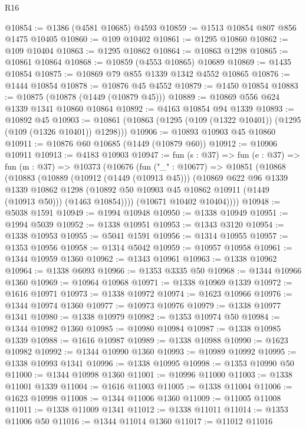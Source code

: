 \begin{lexlean}{R16}
\begin{coremodule}
@10854 := @1386 (@4581 @10685) @4593
@10859 := @1513 @10854 @807 @856 @1475 @10405
@10860 := @109 @10402
@10861 := @1295 @10860
@10862 := @109 @10404
@10863 := @1295 @10862
@10864 := @10863 @1298
@10865 := @10861 @10864
@10868 := @10859 (@4553 @10865) @10689
@10869 := @1435 @10854
@10875 := @10869 @79 @855 @1339 @1342 @4552 @10865
@10876 := @1444 @10854
@10878 := @10876 @45 @4552
@10879 := @1450 @10854
@10883 := @10875 (@10878 (@1449 (@10879 @45)))
@10889 := @10869 @556 @624 @1339 @1341 @10860 @10864
@10892 := @4163 @10854 @94 @1339
@10893 := @10892 @45
@10903 := @10861 (@10863 (@1295 (@109 (@1322 @10401)) (@1295 (@109 (@1326 @10401)) @1298)))
@10906 := @10893 @10903 @45 @10860
@10911 := @10876 @60 @10685 (@1449 (@10879 @60))
@10912 := @10906 @10911
@10913 := @4183 @10903
@10947 := fun (s : @37) =>
  fun (e : @37) =>
  fun (m : @37) =>
  @10373
    (@10676
      (fun ("_" : @10677) =>
      @10851
        (@10868
          (@10883
            (@10889
              (@10912 (@1449 (@10913 @45)))
              (@10869
                @622
                @96
                @1339
                @1339
                @10862
                @1298
                (@10892 @50 @10903 @45 @10862 @10911 (@1449 (@10913 @50)))
                (@1463 @10854))))
          (@10671 @10402 @10404))))
@10948 := @5038 @1591
@10949 := @1994 @10948
@10950 := @1338 @10949
@10951 := @1994 @5039
@10952 := @1338 @10951
@10953 := @1343 @3120
@10954 := @1338 @10953
@10955 := @5041 @1591
@10956 := @1314 @10955
@10957 := @1353 @10956
@10958 := @1314 @5042
@10959 := @10957 @10958
@10961 := @1344 @10959 @1360
@10962 := @1343 @10961
@10963 := @1338 @10962
@10964 := @1338 @6093
@10966 := @1353 @3335 @50
@10968 := @1344 @10966 @1360
@10969 := @10964 @10968
@10971 := @1338 @10969 @1339
@10972 := @1616 @10971
@10973 := @1338 @10972
@10974 := @1623 @10966
@10976 := @1344 @10974 @1360
@10977 := @10973 @10976
@10979 := @1338 @10977 @1341
@10980 := @1338 @10979
@10982 := @1353 @10974 @50
@10984 := @1344 @10982 @1360
@10985 := @10980 @10984
@10987 := @1338 @10985 @1339
@10988 := @1616 @10987
@10989 := @1338 @10988
@10990 := @1623 @10982
@10992 := @1344 @10990 @1360
@10993 := @10989 @10992
@10995 := @1338 @10993 @1341
@10996 := @1338 @10995
@10998 := @1353 @10990 @50
@11000 := @1344 @10998 @1360
@11001 := @10996 @11000
@11003 := @1338 @11001 @1339
@11004 := @1616 @11003
@11005 := @1338 @11004
@11006 := @1623 @10998
@11008 := @1344 @11006 @1360
@11009 := @11005 @11008
@11011 := @1338 @11009 @1341
@11012 := @1338 @11011
@11014 := @1353 @11006 @50
@11016 := @1344 @11014 @1360
@11017 := @11012 @11016

\end{coremodule}
\end{lexlean}
